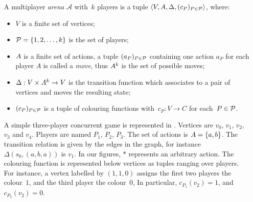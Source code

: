 \begin{definition}
  A multiplayer \emph{arena} \(\mathcal{A}\) with~$k$ players is a tuple
  \(\langle V, A,\Delta,(c_P)_{P\in \mathcal{P}} \rangle \), where:

  \begin{itemize}

  \item     \(V\) is a finite set of vertices;
  \item     \(\mathcal{P} = \{1,2,\ldots,k\}\) is the set of players;
  \item     \(A\) is a finite set of actions, a tuple \((a_P)_{P \in \mathcal{P}}\)
    containing one action \(a_P\) for each player $A$ is called a
    \emph{move}, thus \(A^k\) is the set of possible moves;
  \item     \(\Delta : V \times A^k \to V\) is the transition function which
    associates to a pair of vertices and moves the resulting state;
  \item     \((c_P)_{P \in \mathcal{P}}\) is a tuple of colouring functions
    with~$c_P : V \rightarrow C$ for each~$P \in \mathcal{P}$.
  \end{itemize}
\end{definition}

\begin{example}
A simple three-player concurrent game is represented in .
Vertices are $v_0$, $v_1$, $v_2$, $v_3$ and $v_4$.
Players are named $P_1$, $P_2$, $P_3$.
The set of actions is $A = \{ a , b\}$.
The transition relation is given by the edges in the graph, for instance
$\Delta(s_0, (a, b, a))$ is $v_1$. In our figures, $\ast$ represents
an arbitrary action.
The colouring function is represented below vertices as tuples ranging over players.
For instance, a vertex labelled by $(1,1,0)$ assigns
the first two players the colour~$1$, and the third player the colour~$0$,
In particular, $c_{P_1}(v_2) = 1$, and $c_{P_3}(v_2)= 0$.
\end{example}


